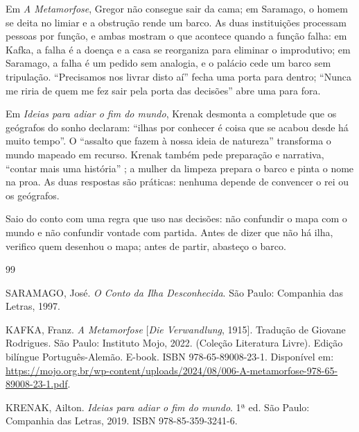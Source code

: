 \documentclass[12pt]{article}
\begin{document}
Em \emph{A Metamorfose}, Gregor não consegue sair da cama; em Saramago, o homem se deita no limiar e a obstrução rende um barco. As duas instituições processam pessoas por função, e ambas mostram o que acontece quando a função falha: em Kafka, a falha é a doença e a casa se reorganiza para eliminar o improdutivo; em Saramago, a falha é um pedido sem analogia, e o palácio cede um barco sem tripulação. ``Precisamos nos livrar disto aí'' fecha uma porta para dentro; ``Nunca me riria de quem me fez sair pela porta das decisões'' abre uma para fora.

Em \emph{Ideias para adiar o fim do mundo}, Krenak desmonta a completude que os geógrafos do sonho declaram: ``ilhas por conhecer é coisa que se acabou desde há muito tempo''. O ``assalto que fazem à nossa ideia de natureza'' \cite[p. 16]{krenak2019} transforma o mundo mapeado em recurso. Krenak também pede preparação e narrativa, ``contar mais uma história'' \cite[p. 27]{krenak2019}; a mulher da limpeza prepara o barco e pinta o nome na proa. As duas respostas são práticas: nenhuma depende de convencer o rei ou os geógrafos.

Saio do conto com uma regra que uso nas decisões: não confundir o mapa com o mundo e não confundir vontade com partida. Antes de dizer que não há ilha, verifico quem desenhou o mapa; antes de partir, abasteço o barco.

\begin{thebibliography}{99}

SARAMAGO, José.
\emph{O Conto da Ilha Desconhecida}.
São Paulo: Companhia das Letras, 1997.

KAFKA, Franz.
\emph{A Metamorfose} [\emph{Die Verwandlung}, 1915].
Tradução de Giovane Rodrigues.
São Paulo: Instituto Mojo, 2022. (Coleção Literatura Livre).
Edição bilíngue Português-Alemão. E-book.
ISBN 978-65-89008-23-1.
Disponível em: \url{https://mojo.org.br/wp-content/uploads/2024/08/006-A-metamorfose-978-65-89008-23-1.pdf}.

KRENAK, Ailton.
\emph{Ideias para adiar o fim do mundo}.
1ª ed. São Paulo: Companhia das Letras, 2019.
ISBN 978-85-359-3241-6.

\end{thebibliography}
\end{document}
